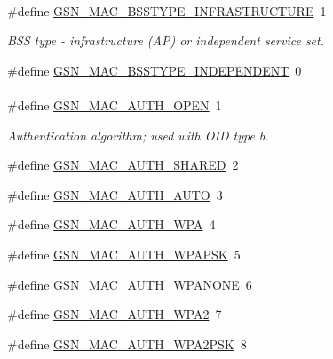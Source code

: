 \paragraph*{}
\begin{DoxyCompactItemize}
\item 
\#define \hyperlink{a00642_ga2372fc9534269f16c2e02d4c02bd9678}{GSN\_\-MAC\_\-BSSTYPE\_\-INFRASTRUCTURE}~1
\begin{DoxyCompactList}\small\item\em BSS type -\/ infrastructure (AP) or independent service set. \end{DoxyCompactList}\item 
\#define \hyperlink{a00642_ga87bb2904a9980d0ecf8f90a9def53f8b}{GSN\_\-MAC\_\-BSSTYPE\_\-INDEPENDENT}~0
\end{DoxyCompactItemize}

\paragraph*{}
\begin{DoxyCompactItemize}
\item 
\#define \hyperlink{a00642_ga1153f0727bac49c704c19659c6af8126}{GSN\_\-MAC\_\-AUTH\_\-OPEN}~1
\begin{DoxyCompactList}\small\item\em Authentication algorithm; used with OID type b. \end{DoxyCompactList}\item 
\#define \hyperlink{a00642_gaf44feac70f9ce6dc783578b7ccc2f8a3}{GSN\_\-MAC\_\-AUTH\_\-SHARED}~2
\item 
\#define \hyperlink{a00642_gab184a6403ca2858aefd8100162c3d123}{GSN\_\-MAC\_\-AUTH\_\-AUTO}~3
\item 
\#define \hyperlink{a00642_ga0a443ae2a1e4873621cdbb480dc8a7fc}{GSN\_\-MAC\_\-AUTH\_\-WPA}~4
\item 
\#define \hyperlink{a00642_gab69f885fde7c0cc3a634bdb6c59137b4}{GSN\_\-MAC\_\-AUTH\_\-WPAPSK}~5
\item 
\#define \hyperlink{a00642_gac24885ac3891945ce4609aa30ef41a04}{GSN\_\-MAC\_\-AUTH\_\-WPANONE}~6
\item 
\#define \hyperlink{a00642_gacffb560e436c18bd91375b8f3ecda578}{GSN\_\-MAC\_\-AUTH\_\-WPA2}~7
\item 
\#define \hyperlink{a00642_gafdd52a10528e2f3e5277f4ecc458e3b9}{GSN\_\-MAC\_\-AUTH\_\-WPA2PSK}~8
\end{DoxyCompactItemize}

